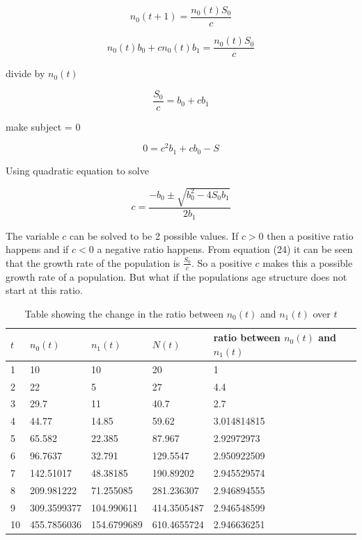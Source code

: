 \documentclass[final]{cmpreport}
\begin{document}
	\begin{equation}
	n_0(t+1) = \frac{ n_0(t)S_0}{c}
	\end{equation}
	
	\begin{equation}
	 n_0(t)b_0 + cn_0(t)b_1 =\frac{ n_0(t)S_0}{c}
	\end{equation}
	
	divide by $n_0(t)$
	
	\begin{equation}
	 \frac{S_0}{c} = b_0 + cb_1 
	\end{equation}
	
	make subject = 0 
	
	\begin{equation}
	 0 = c^2b_1+ cb_0 -S 
	\end{equation}
	
	Using quadratic equation to solve
	
	\begin{equation}
	 c=\frac{-b_0\pm\sqrt{b_0^2-4S_0b_1}}{2b_1}   
	\end{equation}
	
	The variable $c$ can be solved to be 2 possible values. If $c>0$ then a positive ratio happens  and if $c<0$ a negative ratio happens. From equation (24) it can be seen that the growth rate of the population is $\frac{S_0}{c} $. So a positive $c$ makes this a possible growth rate of a population. But what if the populations age structure does not start at this ratio.
	
	
	\begin{table}[h!]
		\centering
		\caption{Table showing the change in the  ratio between  $n_0(t)$ and  $n_1(t)$ over $t$}
		\begin{tabular}{|l|l|l|l|l|}
			\hline
			$t$  & $n_0(t)$  & $n_1(t)$  & $N(t)$       & ratio between  $n_0(t)$ and  $n_1(t)$    \\
			\hline
			1  & 10          & 10          & 20          & 1           \\
			2  & 22          & 5           & 27          & 4.4         \\
			3  & 29.7        & 11          & 40.7        & 2.7         \\
			4  & 44.77       & 14.85       & 59.62       & 3.014814815 \\
			5  & 65.582      & 22.385      & 87.967      & 2.92972973  \\
			6  & 96.7637     & 32.791      & 129.5547    & 2.950922509 \\
			7  & 142.51017   & 48.38185    & 190.89202   & 2.945529574 \\
			8  & 209.981222  & 71.255085   & 281.236307  & 2.946894555 \\
			9  & 309.3599377 & 104.990611  & 414.3505487 & 2.946548599 \\
			10 & 455.7856036 & 154.6799689 & 610.4655724 & 2.946636251 \\
			\hline
		\end{tabular}
	\end{table}
	
\end{document}

